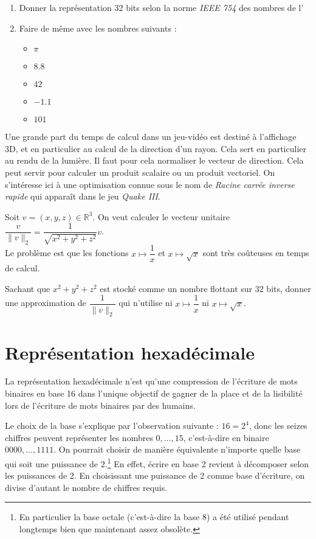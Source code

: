 \documentclass[../../main.tex]{subfiles}
\begin{document}
\begin{enumerate}
    \item Donner la représentation 32 bits selon la norme \textit{IEEE 754} des nombres de l' 
    \item Faire de même avec les nombres suivants :
\begin{itemize}
     \item $\pi$
     \item $8.8$
     \item $42$
     \item $-1.1$
     \item $101$
\end{itemize}
\end{enumerate}

 Une grande part du temps de calcul dans un jeu-vidéo est destiné à l'affichage 3D, et en particulier au calcul de la direction d'un rayon. Cela sert en particulier au rendu de la lumière. Il faut pour cela normaliser le vecteur de direction. Cela peut servir pour calculer un produit scalaire ou un produit vectoriel. On s'intéresse ici à une optimisation connue sous le nom de \textit{Racine carrée inverse rapide} qui apparaît dans le jeu \textit{Quake III}.

Soit $v = (x, y, z)\in\mathbb{R}^3$. On veut calculer le vecteur unitaire $\dfrac{v}{\lVert v\rVert_2} = \dfrac{1}{\sqrt{x^2 + y^2 + z^2}}v$. \\
Le problème est que les fonctions $x\mapsto\dfrac{1}{x}$ et $x\mapsto\sqrt{x}$ sont très coûteuses en temps de calcul.

Sachant que $x^2 + y^2 + z^2$ est stocké comme un nombre flottant sur 32 bits, donner une approximation de $\dfrac{1}{\lVert v\rVert_2}$ qui n'utilise ni $x\mapsto\dfrac{1}{x}$ ni $x\mapsto\sqrt{x}$.
\section{Représentation hexadécimale} \label{sec:repr_sentation_hexad_cimale}
La représentation hexadécimale n'est qu'une compression de l'écriture de mots binaires en base 16 dans l'unique objectif de gagner de la place et de la lisibilité lors de l'écriture de mots binaires par des humains.

Le choix de la base s'explique par l'observation suivante : $16 = 2^{4}$, donc les seizes chiffres peuvent représenter les nombres $0, \dots, 15$, c'est-à-dire en binaire $0000, \dots, 1111$. On pourrait choisir de manière équivalente n'importe quelle base qui soit une puissance de $2$.\footnote{En particulier la base octale (c'est-à-dire la base 8) a été utilisé pendant longtemps bien que maintenant assez obsolète.} En effet, écrire en base 2 revient à décomposer selon les puissances de 2. En choisissant une puissance de 2 comme base d'écriture, on divise d'autant le nombre de chiffres requis.
\end{document}

